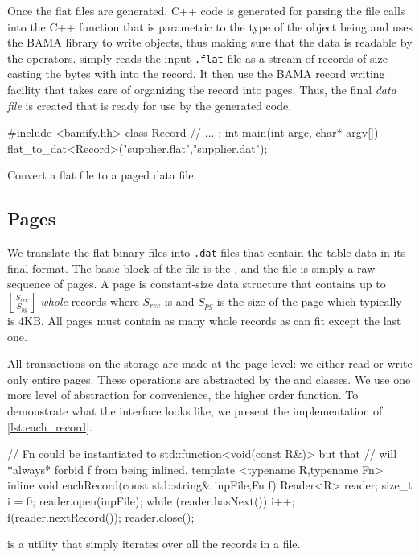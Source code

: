 Once the flat files are generated, C++ code is generated for parsing
the file calls into the C++ function  that is parametric
to the type of the object being and uses the BAMA library to write
objects, thus making sure that the data is readable by the
operators.  simply reads the input \texttt{.flat} file as a
stream of records of size  casting the bytes with
 into the record. It then use the BAMA
record writing facility  that takes care of
organizing the record into pages. Thus, the final \emph{data file} is
created that is ready for use by the generated code.

\begin{code}
\begin{cppcode}
#include <bamify.hh>
class Record {
  // ...
};
int main(int argc, char* argv[]) {
  flat_to_dat<Record>("supplier.flat","supplier.dat");
}
\end{cppcode}
  \caption{Convert a flat file to a paged data file.}
\end{code}

\subsection{Pages}

We translate the flat binary files into \texttt{.dat} files that
contain the table data in its final format. The basic block of the
file is the , and the file is simply a raw sequence of
pages. A page is constant-size data structure that contains up to
\(\left\lfloor\frac{S_{rec}}{S_{pg}} \right\rfloor\) \emph{whole}
records where \(S_{rec}\) is  and \(S_{pg}\) is
the size of the page which typically is 4KB. All pages must contain as
many whole records as can fit except the last one.

All transactions on the storage are made at the page level: we
either read or write only entire pages. These operations are
abstracted by the  and  classes. We use one more level
of abstraction for convenience, the higher order 
function. To demonstrate what the interface looks like, we present the
implementation of  \ref{lst:each_record}.

\begin{code}
\begin{cppcode}
// Fn could be instantiated to std::function<void(const R&)> but that
// will *always* forbid f from being inlined.
template <typename R,typename Fn>
inline void eachRecord(const std::string& inpFile,Fn f) {
  Reader<R> reader;
  size_t i = 0;
  reader.open(inpFile);
  while (reader.hasNext()) {
    i++;
    f(reader.nextRecord());
  }
  reader.close();
}
\end{cppcode}
\caption{\label{lst:each_record} is a utility that simply iterates over all the records in a file.}
\end{code}

